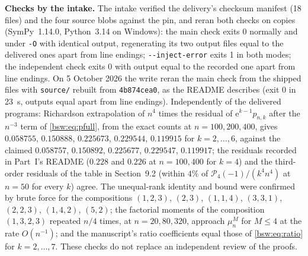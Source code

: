 \documentclass[11pt,letterpaper]{article}
\theoremstyle{definition}
\theoremstyle{remark}
\newcommand{\ee}{\mathrm e}
\begin{document}
\textbf{Checks by the intake.}  The intake verified the delivery's
checksum manifest (18 files) and the four source blobs against the pin,
and reran both checks on copies (SymPy~1.14.0, Python~3.14 on Windows):
the main check exits 0 normally and under \texttt{-O} with identical
output, regenerating its two output files equal to the delivered ones apart
from line endings; \texttt{-{}-inject-error} exits 1 in both modes; the
independent check exits 0 with output equal to the recorded one apart from
line endings.  On 5 October 2026 the write reran the main check from the
shipped files with \texttt{source/} rebuilt from \texttt{4b874cea0}, as
the README describes (exit 0 in 23~s, outputs equal apart from line
endings).  Independently of the delivered programs: Richardson
extrapolation of $n^4$ times the residual of $\ee^{k-1}p_{n,k}$ after the
$n^{-3}$ term of \eqref{bsw:eq:pfull}, from the exact counts at
$n=100,200,400$, gives $0.058755$, $0.150888$, $0.225673$,
$0.229544$, $0.119915$ for $k=2,\ldots,6$, against the claimed $0.058757$,
$0.150892$, $0.225677$, $0.229547$, $0.119917$; the residuals recorded in
Part~I's README ($0.228$ and $0.226$ at $n=100,400$ for $k=4$) and the
third-order residuals of the table in Section~9.2 (within $4\%$ of
$\mathcal P_4(-1)/(k^4n^4)$ at $n=50$ for every $k$) agree.  The
unequal-rank identity and bound were confirmed by brute force for the
compositions $(1,2,3)$, $(2,3)$, $(1,1,4)$, $(3,3,1)$, $(2,2,3)$,
$(1,4,2)$, $(5,2)$; the factorial moments of the composition
$(1,3,2,3)$ repeated $n/4$ times, at $n=20,80,320$, approach $\mu_n^M$ for
$M\le4$ at the rate $O(n^{-1})$; and the manuscript's ratio coefficients
equal those of \eqref{bsw:eq:ratio} for $k=2,\ldots,7$.  These checks do
not replace an independent review of the proofs.
\end{document}
